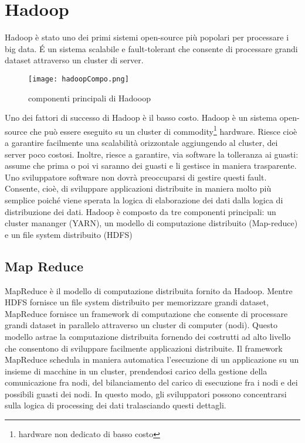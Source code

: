 \section{Hadoop}
Hadoop è stato uno dei primi sistemi open-source più popolari per processare i big data.
\'E un sistema scalabile e fault-tolerant che consente di processare grandi dataset attraverso un cluster di server.  


\begin{figure}[h]
\centering
\texttt{[image: hadoopCompo.png]}
\caption{componenti principali di Hadooop}
\label{fig:hadoopComponets}
\end{figure} 
 
Uno dei fattori di successo di Hadoop è il basso costo. Hadoop è un sistema open-source che può essere eseguito su un cluster di commodity\footnote{hardware non dedicato di basso costo} hardware. Riesce cioè a garantire facilmente una scalabilità orizzontale aggiungendo al cluster, dei server poco costosi. Inoltre, riesce a garantire, via software la tolleranza ai guasti: assume che prima o poi vi saranno dei guasti e li gestisce in maniera trasparente. Uno sviluppatore software non dovrà preoccuparsi di gestire questi fault. Consente, cioè, di sviluppare applicazioni distribuite in maniera molto più semplice poiché viene sperata la logica di elaborazione dei dati dalla logica di distribuzione dei dati.
Hadoop è composto da tre componenti principali: un cluster mananger (YARN), un modello di computazione distribuito (Map-reduce) e un file system distribuito (HDFS)



 
 \subsection{Map Reduce}
 MapReduce è il modello di computazione distribuita fornito da Hadoop. Mentre HDFS fornisce un file system distribuito per memorizzare grandi dataset, MapReduce fornisce un framework di computazione che consente di processare grandi dataset in parallelo attraverso un cluster di computer (nodi). Questo modello astrae la computazione distribuita fornendo dei costrutti ad alto livello che consentono di sviluppare facilmente applicazioni distribuite.
 Il framework MapReduce schedula in maniera automatica l'esecuzione di un applicazione su un insieme di macchine in un cluster, prendendosi carico  della gestione della comunicazione fra nodi, del bilanciamento del carico di esecuzione fra i nodi e dei possibili guasti dei nodi.
In questo modo, gli sviluppatori possono concentrarsi sulla logica di processing dei dati tralasciando questi dettagli.

